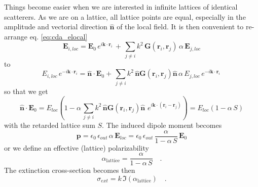 Things become easier when we are interested in infinite lattices of identical scatterers. As we are on a lattice, all lattice points are equal, especially in the amplitude and vectorial direction $\mathbf{\hat{n}}$ of the local field. It is then 
 convenient to re-arrange eq. \ref{eq:cda_elocal}
\begin{equation}
\mathbf{E}_{i, loc} =\mathbf{E}_{0} \, e^{i \mathbf{k} \cdot \mathbf{r}_i} \, +  \, 
 \sum_{j \neq i} k^2 \, 
\mathbf{G}(\mathbf{r}_i, \mathbf{r}_j) \,    \alpha \, \mathbf{E}_{j,loc}
\end{equation}
to
\begin{equation}
E_{i, loc}  \, e^{-i \mathbf{k} \cdot \mathbf{r}_i} =\mathbf{\hat{n}} \cdot \mathbf{E}_{0}  +  \, 
 \sum_{j \neq i} k^2 \, 
 \mathbf{\hat{n}} \mathbf{G}(\mathbf{r}_i, \mathbf{r}_j)  \mathbf{\hat{n}}\,    \alpha \, E_{j,loc} \, e^{-i \mathbf{k} \cdot \mathbf{r}_i} \,
\end{equation}
so that we get
\begin{equation}
\mathbf{\hat{n}} \cdot \mathbf{E}_{0} = 
E_{loc} \left( 1 -     \alpha  \,
 \sum_{j \neq i} k^2 \, 
 \mathbf{\hat{n}} \mathbf{G}(\mathbf{r}_i, \mathbf{r}_j)  \mathbf{\hat{n}}\,     \, e^{i \mathbf{k} \cdot ( \mathbf{r}_i - \mathbf{r}_j  ) } \right)
 = 
 {E}_{loc} \left( 1 -     \alpha  \, S \right)
\end{equation}
with the retarded lattice sum $S$. The induced
dipole moment becomes 
\begin{equation}
\mathbf{p} = \epsilon_0 \, \epsilon_{out} \, \alpha \, \mathbf{E}_{loc} =  \epsilon_0 \, \epsilon_{out} \, \frac{\alpha}{ 1 -     \alpha  \, S } \,
  \mathbf{E}_{0} 
\end{equation} 
or  we define an effective (lattice) polarizability
\begin{equation}
\alpha_\text{lattice} = \frac{\alpha}{ 1 -     \alpha  \, S }  \quad .
\end{equation} 
The extinction cross-section becomes then
\begin{equation}
\sigma_{ext} = k \, \Im(\alpha_\text{lattice})  \quad .
\end{equation}



\printbibliography[segment=\therefsegment,heading=subbibliography]




